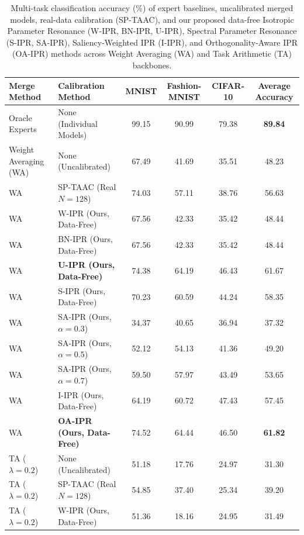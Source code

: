 \documentclass{article}
\begin{document}
\begin{table}[t]
\caption{Multi-task classification accuracy (\%) of expert baselines, uncalibrated merged models, real-data calibration (SP-TAAC), and our proposed data-free Isotropic Parameter Resonance (W-IPR, BN-IPR, U-IPR), Spectral Parameter Resonance (S-IPR, SA-IPR), Saliency-Weighted IPR (I-IPR), and Orthogonality-Aware IPR (OA-IPR) methods across Weight Averaging (WA) and Task Arithmetic (TA) backbones.}
\label{tab:results}
\vskip 0.05in
\begin{center}
\begin{footnotesize}
\begin{sc}
\renewcommand{\arraystretch}{0.88}
\begin{tabular}{llcccc}
\toprule
Merge Method & Calibration Method & MNIST & Fashion-MNIST & CIFAR-10 & Average Accuracy \\
\midrule
Oracle Experts & None (Individual Models) & 99.15 & 90.99 & 79.38 & \textbf{89.84} \\
\midrule
Weight Averaging (WA) & None (Uncalibrated) & 67.49 & 41.69 & 35.51 & 48.23 \\
WA & SP-TAAC (Real $N=128$) & 74.03 & 57.11 & 38.76 & 56.63 \\
WA & W-IPR (Ours, Data-Free) & 67.56 & 42.33 & 35.42 & 48.44 \\
WA & BN-IPR (Ours, Data-Free) & 67.56 & 42.33 & 35.42 & 48.44 \\
WA & \textbf{U-IPR (Ours, Data-Free)} & 74.38 & 64.19 & 46.43 & 61.67 \\
WA & S-IPR (Ours, Data-Free) & 70.23 & 60.59 & 44.24 & 58.35 \\
WA & SA-IPR (Ours, $\alpha = 0.3$) & 34.37 & 40.65 & 36.94 & 37.32 \\
WA & SA-IPR (Ours, $\alpha = 0.5$) & 52.12 & 54.13 & 41.36 & 49.20 \\
WA & SA-IPR (Ours, $\alpha = 0.7$) & 59.50 & 57.97 & 43.49 & 53.65 \\
WA & I-IPR (Ours, Data-Free) & 64.19 & 60.72 & 47.43 & 57.45 \\
WA & \textbf{OA-IPR (Ours, Data-Free)} & 74.52 & 64.44 & 46.50 & \textbf{61.82} \\
\midrule
TA ($\lambda = 0.2$) & None (Uncalibrated) & 51.18 & 17.76 & 24.97 & 31.30 \\
TA ($\lambda = 0.2$) & SP-TAAC (Real $N=128$) & 54.85 & 37.40 & 25.34 & 39.20 \\
TA ($\lambda = 0.2$) & W-IPR (Ours, Data-Free) & 51.36 & 18.16 & 24.95 & 31.49 \\

\end{tabular}
\end{sc}
\end{footnotesize}
\end{center}
\end{table}
\end{document}
